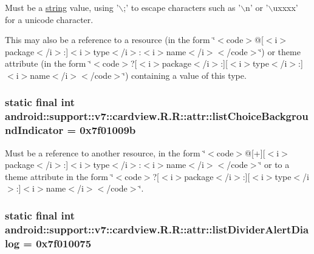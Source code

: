 Must be a \hyperlink{classandroid_1_1support_1_1v7_1_1cardview_1_1_r_1_1string}{string} value, using '$\backslash$;' to escape characters such as '$\backslash$n' or '$\backslash$uxxxx' for a unicode character. 

This may also be a reference to a resource (in the form \char`\"{}$<$code$>$@\mbox{[}$<$i$>$package$<$/i$>$:\mbox{]}$<$i$>$type$<$/i$>$:$<$i$>$name$<$/i$>$$<$/code$>$\char`\"{}) or theme attribute (in the form \char`\"{}$<$code$>$?\mbox{[}$<$i$>$package$<$/i$>$:\mbox{]}\mbox{[}$<$i$>$type$<$/i$>$:\mbox{]}$<$i$>$name$<$/i$>$$<$/code$>$\char`\"{}) containing a value of this type. \hypertarget{classandroid_1_1support_1_1v7_1_1cardview_1_1_r_1_1attr_7330f5284ce41e9c1004f0d7c52d3ffa}{
\subsubsection[{listChoiceBackgroundIndicator}]{\setlength{\rightskip}{0pt plus 5cm}static final int android::support::v7::cardview.R.R::attr::listChoiceBackgroundIndicator = 0x7f01009b}}
\label{classandroid_1_1support_1_1v7_1_1cardview_1_1_r_1_1attr_7330f5284ce41e9c1004f0d7c52d3ffa}


Must be a reference to another resource, in the form \char`\"{}$<$code$>$@\mbox{[}+\mbox{]}\mbox{[}$<$i$>$package$<$/i$>$:\mbox{]}$<$i$>$type$<$/i$>$:$<$i$>$name$<$/i$>$$<$/code$>$\char`\"{} or to a theme attribute in the form \char`\"{}$<$code$>$?\mbox{[}$<$i$>$package$<$/i$>$:\mbox{]}\mbox{[}$<$i$>$type$<$/i$>$:\mbox{]}$<$i$>$name$<$/i$>$$<$/code$>$\char`\"{}. \hypertarget{classandroid_1_1support_1_1v7_1_1cardview_1_1_r_1_1attr_b3adc5eeb2dc9294513539a9d8d486ac}{
\subsubsection[{listDividerAlertDialog}]{\setlength{\rightskip}{0pt plus 5cm}static final int android::support::v7::cardview.R.R::attr::listDividerAlertDialog = 0x7f010075}}
\label{classandroid_1_1support_1_1v7_1_1cardview_1_1_r_1_1attr_b3adc5eeb2dc9294513539a9d8d486ac}


